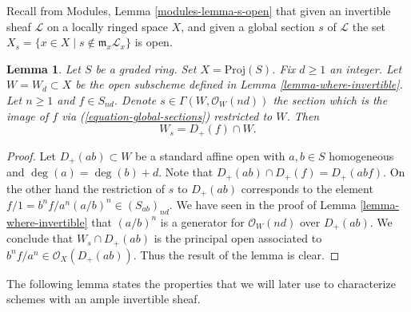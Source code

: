 \documentclass{stacks-project}
\theoremstyle{plain}
\newtheorem{lemma}[subsection]{Lemma}
\theoremstyle{definition}
\theoremstyle{remark}
\numberwithin{equation}{subsection}
\begin{document}
\noindent
Recall from Modules, Lemma \ref{modules-lemma-s-open}
that given an invertible sheaf $\mathcal{L}$ on a locally ringed
space $X$, and given a global section $s$ of $\mathcal{L}$
the set $X_s = \{x \in X \mid s \not \in \mathfrak m_x\mathcal{L}_x\}$
is open.

\begin{lemma}
\label{lemma-principal-open}
Let $S$ be a graded ring. Set $X = \text{Proj}(S)$. Fix $d \geq 1$ an
integer. Let $W = W_d \subset X$ be the open subscheme defined in
Lemma \ref{lemma-where-invertible}. Let $n \geq 1$ and $f \in S_{nd}$.
Denote $s \in \Gamma(W, \mathcal{O}_W(nd))$ the section which is
the image of $f$ via (\ref{equation-global-sections}) restricted to $W$. Then
$$
W_s = D_{+}(f) \cap W.
$$
\end{lemma}

\begin{proof}
Let $D_{+}(ab) \subset W$ be a standard affine open with
$a, b \in S$ homogeneous and $\deg(a) = \deg(b) + d$.
Note that $D_{+}(ab) \cap D_{+}(f) = D_{+}(abf)$.
On the other hand the restriction of $s$ to $D_{+}(ab)$
corresponds to the element $f/1 = b^nf/a^n (a/b)^n \in (S_{ab})_{nd}$.
We have seen in the proof of Lemma \ref{lemma-where-invertible} that
$(a/b)^n$ is a generator for $\mathcal{O}_W(nd)$ over $D_{+}(ab)$.
We conclude that $W_s \cap D_{+}(ab)$ is the principal open
associated to $b^nf/a^n \in \mathcal{O}_X(D_{+}(ab))$.
Thus the result of the lemma is clear.
\end{proof}

\noindent
The following lemma states the properties that we will later use to
characterize schemes with an ample invertible sheaf.
\end{document}
